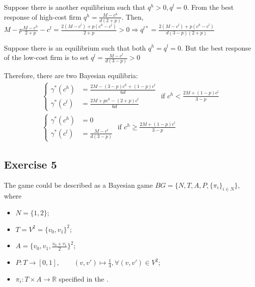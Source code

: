 \documentclass[]{article}
\begin{document}
Suppose there is another equilibrium such that $q^h > 0, q^l = 0$. From the best response of high-cost firm $q^h = \frac{M - c^h}{d(2 + p)}$. Then, $M - p\frac{M - c^h}{2 + p} - c^l = \frac{2(M - c^l) + p(c^h - c^l)}{2 + p} > 0 \Rightarrow q^{l*} = \frac{2(M - c^l) + p(c^h - c^l)}{d(3 - p)(2 + p)}$ \Lightning

Suppose there is an equilibrium such that both $q^h = q^l = 0$. But the best response of the low-cost firm is to set $q^l = \frac{M - c^l}{d(3 - p)} > 0$ \Lightning

Therefore, there are two Bayesian equilibria:
\begin{equation}
	\begin{split}
		&\begin{cases}
			\gamma^*(c^h)& = \frac{2M - (3 - p)c^h + (1 - p)c^l}{6d} \\
			\gamma^*(c^l)& = \frac{2M + pc^h - (2 + p)c^l}{6d}
		\end{cases}\text{ if } c^h < \frac{2M + (1 - p)c^l}{3 - p}\\ \nonumber
		&\begin{cases}
			\gamma^*(c^h)& = 0 \\
			\gamma^*(c^l)& = \frac{M - c^l}{d(3 - p)}
		\end{cases}\text{ if } c^h \geq \frac{2M + (1 - p)c^l}{3 - p}
	\end{split}
\end{equation}

\subsection*{Exercise 5}

The game could be described as a Bayesian game $BG = \{N, T, A, P, \{\pi_i\}_{i\in N}\}$, where
\begin{itemize}[label={}]
	\item $N = \{1, 2\}$;
	\item $T = V^2 = \{v_0, v_1\}^2$;
	\item $A = \{v_0, v_1, \frac{v_0 + v_1}{2}\}^2$;
	\item $P: T \to [0, 1], \qquad (v, v') \mapsto \frac{1}{4},\forall(v, v')\in V^2$;
	\item $\pi_i: T\times A\to \mathbb{R}$ specified in the .
\end{itemize}
\end{document}
